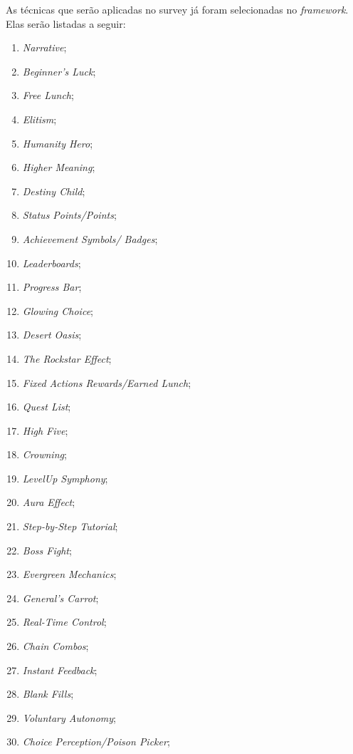 As técnicas que serão aplicadas no survey já foram selecionadas no \textit{framework}. Elas serão listadas a seguir:

\begin{multicols}{2}
    \begin{enumerate}
        \item \textit{Narrative};
        \item \textit{Beginner's Luck};
        \item \textit{Free Lunch};
        \item \textit{Elitism};
        \item \textit{Humanity Hero};
        \item \textit{Higher Meaning};
        \item \textit{Destiny Child};
        \item \textit{Status Points/Points};
        \item \textit{Achievement Symbols/ Badges};
        \item \textit{Leaderboards};
        \item \textit{Progress Bar};
        \item \textit{Glowing Choice};
        \item \textit{Desert Oasis};
        \item \textit{The Rockstar Effect};
        \item \textit{Fixed Actions Rewards/Earned Lunch};
        \item \textit{Quest List};
        \item \textit{High Five};
        \item \textit{Crowning};
        \item \textit{LevelUp Symphony};
        \item \textit{Aura Effect};
        \item \textit{Step-by-Step Tutorial};
        \item \textit{Boss Fight};
        \item \textit{Evergreen Mechanics};
        \item \textit{General's Carrot};
        \item \textit{Real-Time Control};
        \item \textit{Chain Combos};
        \item \textit{Instant Feedback};
        \item \textit{Blank Fills};
        \item \textit{Voluntary Autonomy};
        \item \textit{Choice Perception/Poison Picker};

\end{enumerate}
\end{multicols}
